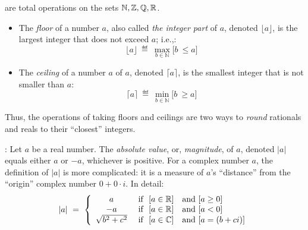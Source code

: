 \medskip


are total operations on the sets $\mathbb{N}, \mathbb{Z}, \mathbb{Q}, \mathbb{R}$.
\begin{itemize}
\item
The {\it floor} of a number $a$, also called {\it the integer part}
of $a$, denoted $\lfloor a \rfloor$, is the largest integer that does
not exceed $a$; i.e.,:
\[
\lfloor a \rfloor \ \eqdef \ \max_{b \in {\mathbb{N}}} \Big[ b \ \leq a \Big]
\]
\item
The {\it ceiling} of a number $a$
of $a$, denoted $\lceil a \rceil$, is the smallest integer that is 
not smaller than $a$:
\[
\lceil a \rceil \ \eqdef \ \min_{b \in {\mathbb{N}}} \Big[ b \ \geq a \Big]
\]
\end{itemize}
Thus, the operations of taking floors and ceilings are two ways to
{\em round} rationals and reals to their ``closest''
integers.

\medskip

:
%
Let $a$ be a real number.  The {\it absolute value}, or, {\it
  magnitude}, of $a$, denoted $|a|$ equals either $a$ or $-a$,
whichever is positive.  For a complex number $a$, the definition of
$|a|$ is more complicated: it is a measure of $a$'s ``distance'' from
the ``origin'' complex number $0 + 0 \cdot i$.  In detail:
\[
|a| \ = \ \left\{
\begin{array}{cl}
a & \mbox{ if } \ [a \in \mathbb{R}] \ \ \mbox{ and } [a \geq 0] \\
-a & \mbox{ if } \ [a \in \mathbb{R}] \ \ \mbox{ and } [a < 0] \\
\sqrt{b^2 + c^2} &  \mbox{ if } \ [a \in \mathbb{C}]  \ \ \mbox{ and } [a = (b+ci)]
\end{array}
\right.
\]

\medskip

